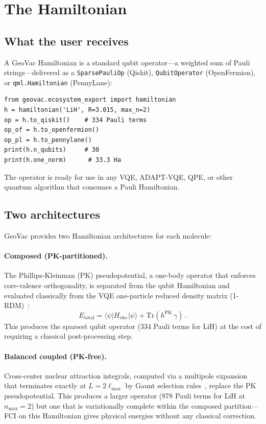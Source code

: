 \documentclass[twocolumn,pra,amsmath,amssymb,superscriptaddress]{revtex4-2}
\begin{document}
\section{The Hamiltonian}
\label{sec:hamiltonian}

\subsection{What the user receives}

A GeoVac Hamiltonian is a standard qubit operator---a weighted sum of
Pauli strings---delivered as a \texttt{SparsePauliOp} (Qiskit),
\texttt{QubitOperator} (OpenFermion), or \texttt{qml.Hamiltonian}
(PennyLane):

\begin{lstlisting}
from geovac.ecosystem_export import hamiltonian
h = hamiltonian('LiH', R=3.015, max_n=2)
op = h.to_qiskit()    # 334 Pauli terms
op_of = h.to_openfermion()
op_pl = h.to_pennylane()
print(h.n_qubits)     # 30
print(h.one_norm)      # 33.3 Ha
\end{lstlisting}

The operator is ready for use in any VQE, ADAPT-VQE, QPE, or other
quantum algorithm that consumes a Pauli Hamiltonian.

\subsection{Two architectures}

GeoVac provides two Hamiltonian architectures for each molecule:

\paragraph{Composed (PK-partitioned).}
The Phillips-Kleinman (PK) pseudopotential, a one-body operator that
enforces core-valence orthogonality, is separated from the qubit
Hamiltonian and evaluated classically from the VQE one-particle
reduced density matrix (1-RDM)~\cite{GeoVac_Paper17}:
\begin{equation}
  E_{\text{total}} = \langle\psi|H_{\text{elec}}|\psi\rangle
    + \mathrm{Tr}(h^{\text{PK}}\,\gamma)\,.
\end{equation}
This produces the sparsest qubit operator (334 Pauli terms for LiH)
at the cost of requiring a classical post-processing step.

\paragraph{Balanced coupled (PK-free).}
Cross-center nuclear attraction integrals, computed via a multipole
expansion that terminates exactly at $L = 2\ell_{\max}$ by Gaunt
selection rules~\cite{GeoVac_Paper19}, replace the PK pseudopotential.
This produces a larger operator (878 Pauli terms for LiH at
$n_{\max}=2$) but one that is variationally complete within the
composed partition---FCI on this Hamiltonian gives physical energies
without any classical correction.
\end{document}
